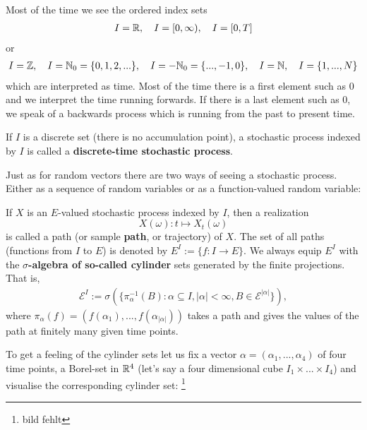 Most of the time we see the ordered index sets 
\begin{align*}
	I=\mathbb{R}, \quad I=[0,\infty), \quad I=[0,T]
\end{align*}
or
\begin{align*}
	I=\mathbb{Z},\quad  I=\mathbb{N}_0=\lbrace 0,1,2,...\rbrace, \quad I=-\mathbb{N}_0=\{...,-1,0\}, \quad I=\mathbb{N}, \quad I=\{1,...,N\}
\end{align*}	 
	  which are interpreted as time. Most of the time there is a first element such as $0$ and we interpret the time running forwards. If there is a last element such as $0$, we speak of a backwards process which is running from the past to present time.
\begin{ldef}
\begin{deff}
	If $I$ is a discrete set (there is no accumulation point), a stochastic process indexed by $I$ is called a \textbf{discrete-time stochastic process}.
\end{deff}
\end{ldef}
Just as for random vectors there are two ways of seeing a stochastic process. Either as a sequence of random variables or as a function-valued random variable:
\begin{ldef}
\begin{deff}
	If $X$ is an $E$-valued stochastic process indexed by $I$, then a realization $$X(\omega):t\mapsto X_t(\omega)$$ is called a path (or sample \textbf{path}, or trajectory) of $X$. The set of all paths (functions from $I$ to $E$) is denoted by $E^I:=\{f:I\to E\}.$
	We always equip $E^I$ with the \textbf{$\sigma$-algebra of so-called cylinder} sets generated by the finite projections. That is,
	\begin{align*}
		\mathcal E^I:= \sigma( \{\pi_\alpha^{-1}(B):\alpha \subseteq I, |\alpha|<\infty, B\in  \mathcal E^{|\alpha|}\}),
	\end{align*}
	where $\pi_\alpha(f)=(f(\alpha_1),...,f(\alpha_{|\alpha|}))$ takes a path and gives the values of the path at finitely many given time points. 
\end{deff}
\end{ldef}
To get a feeling of the cylinder sets let us fix a vector $\alpha=(\alpha_1,..., \alpha_4)$ of four time points, a Borel-set in $\mathbb{R}^4$ (let's say a four dimensional cube $I_1\times ... \times I_4$) and visualise the corresponding cylinder set: \footnote{bild fehlt}



